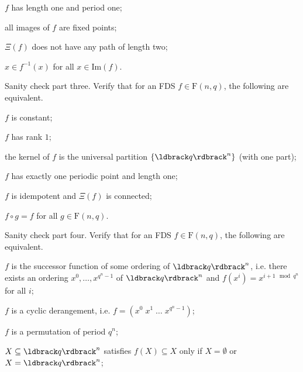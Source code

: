 \documentclass[a4paper, 11pt]{book}
\numberwithin{equation}{section}
\theoremstyle{plain}
\newcommand{\graph}{\Xi}
\newcommand{\functions}{\mathrm{F}}
\newcommand{\image}{\mathrm{Im}}
\newcommand{\espace}{\;}
\renewcommand{\(}{\ldbrack}
\renewcommand{\)}{\rdbrack}
\begin{document}
\begin{exercises}
\begin{exercises}
	\item $f$ has length one and period one;
	
	\item all images of $f$ are fixed points;
	
	\item $\graph(f)$ does not have any path of length two;
		
	\item $x \in f^{-1}(x)$ for all $x \in \image(f)$.
\end{exercises}


\item Sanity check part three. Verify that for an FDS $f \in \functions(n,q)$, the following are equivalent.
\begin{exercises}
	\item $f$ is constant;
	
	\item $f$ has rank $1$;
	
	\item the kernel of $f$ is the universal partition $\{ \(q\)^n \}$ (with one part);
	
	\item $f$ has exactly one periodic point and length one;
	
	\item $f$ is idempotent and $\graph(f)$ is connected;
	
	\item $f \circ g = f$ for all $g \in \functions(n, q)$.
\end{exercises}



\item \label{exerc:sanity_check_cyclic_derangement} Sanity check part four. Verify that for an FDS $f \in \functions(n,q)$, the following are equivalent.
\begin{exercises}
	\item $f$ is the successor function of some ordering of $\(q\)^n$, i.e. there exists an ordering $x^0, \dots, x^{q^n-1}$ of $\(q\)^n$ and $f(x^i) = x^{i+1 \mod q^n}$ for all $i$;

	\item $f$ is a cyclic derangement, i.e. $f = (x^0 \espace x^1 \espace \dots \espace x^{q^n-1})$;
	
	\item $f$ is a permutation of period $q^n$;
	
	\item $X \subseteq \(q\)^n$ satisfies $f(X) \subseteq X$ only if $X = \emptyset$ or $X = \(q\)^n$;
	

\end{exercises}
\end{exercises}
\end{document}
